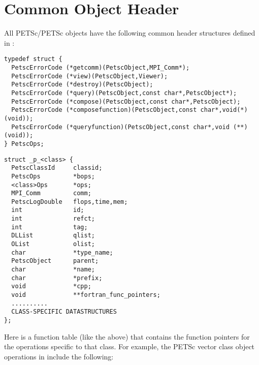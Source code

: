\section{Common Object Header}

All PETSc/PETSc objects have the following common header structures
defined in \href{http://www.mcs.anl.gov/petsc/petsc-master/include/petsc/private/petscimpl.h.html}{}:

\begin{lstlisting}[caption=Function table common to all PETSc compatible classes]
typedef struct { 
  PetscErrorCode (*getcomm)(PetscObject,MPI_Comm*);
  PetscErrorCode (*view)(PetscObject,Viewer);
  PetscErrorCode (*destroy)(PetscObject);
  PetscErrorCode (*query)(PetscObject,const char*,PetscObject*);
  PetscErrorCode (*compose)(PetscObject,const char*,PetscObject);
  PetscErrorCode (*composefunction)(PetscObject,const char*,void(*)(void));
  PetscErrorCode (*queryfunction)(PetscObject,const char*,void (**)(void));
} PetscOps;
\end{lstlisting}
\begin{lstlisting}[caption=Data structure header common to all PETSc compatible classes]
struct _p_<class> {
  PetscClassId     classid;                                  
  PetscOps         *bops;                                   
  <class>Ops       *ops;                                    
  MPI_Comm         comm;                                    
  PetscLogDouble   flops,time,mem;                          
  int              id;                                      
  int              refct;                                   
  int              tag;                                     
  DLList           qlist;                                   
  OList            olist;                                   
  char             *type_name;                              
  PetscObject      parent;                                  
  char             *name;                                    
  char             *prefix;                                 
  void             *cpp;
  void             **fortran_func_pointers;       
  ..........
  CLASS-SPECIFIC DATASTRUCTURES
};
\end{lstlisting}
Here  is a function table (like the  above) that
contains the function pointers for the operations specific to that class.
For example, the PETSc vector class object operations in \href{http://www.mcs.anl.gov/petsc/petsc-master/include/petsc/private/vecimple.h.html}{} include the following:

